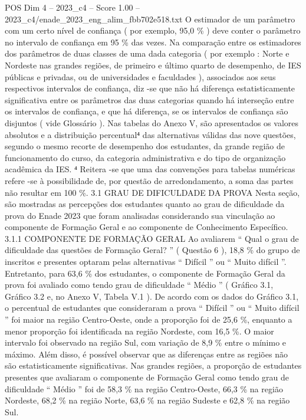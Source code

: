 \begin{textsample}{POS Dim 4 – 2023\_c4 – Score 1.00 – 2023\_c4/enade\_2023\_eng\_alim\_fbb702e518.txt}
O estimador de um parâmetro com um certo nível de confiança ( por exemplo, 95,0 \% ) deve conter o parâmetro no intervalo de confiança em 95 \% das vezes.
Na comparação entre os estimadores dos parâmetros de duas classes de uma dada categoria ( por exemplo : Norte e Nordeste nas grandes regiões, de primeiro e último quarto de desempenho, de IES públicas e privadas, ou de universidades e faculdades ), associados aos seus respectivos intervalos de confiança, diz -se que não há diferença estatisticamente significativa entre os parâmetros das duas categorias quando há interseção entre os intervalos de confiança, e que há diferença, se os intervalos de confiança são disjuntos ( vide Glossário ).
Nas tabelas do Anexo V, são apresentados os valores absolutos e a distribuição percentual⁴ das alternativas válidas das nove questões, segundo o mesmo recorte de desempenho dos estudantes, da grande região de funcionamento do curso, da categoria administrativa e do tipo de organização acadêmica da IES. ⁴ Reitera -se que uma das convenções para tabelas numéricas refere -se à possibilidade de, por questão de arredondamento, a soma das partes não resultar em 100 \%. 3.1 GRAU DE DIFICULDADE DA PROVA Nesta seção, são mostradas as percepções dos estudantes quanto ao grau de dificuldade da prova do Enade 2023 que foram analisadas considerando sua vinculação ao componente de Formação Geral e ao componente de Conhecimento Específico. 3.1.1 COMPONENTE DE FORMAÇÃO GERAL Ao avaliarem “ Qual o grau de dificuldade das questões de Formação Geral? ” ( Questão 6 ), 18,8 \% do grupo de inscritos e presentes optaram pelas alternativas “ Difícil ” ou “ Muito difícil ”.
Entretanto, para 63,6 \% dos estudantes, o componente de Formação Geral da prova foi avaliado como tendo grau de dificuldade “ Médio ” ( Gráfico 3.1, Gráfico 3.2 e, no Anexo V, Tabela V.1 ).
De acordo com os dados do Gráfico 3.1, o percentual de estudantes que consideraram a prova “ Difícil ” ou “ Muito difícil ” foi maior na região Centro-Oeste, onde a proporção foi de 25,6 \%, enquanto a menor proporção foi identificada na região Nordeste, com 16,5 \%.
O maior intervalo foi observado na região Sul, com variação de 8,9 \% entre o mínimo e máximo.
Além disso, é possível observar que as diferenças entre as regiões não são estatisticamente significativas.
Nas grandes regiões, a proporção de estudantes presentes que avaliaram o componente de Formação Geral como tendo grau de dificuldade “ Médio ” foi de 58,3 \% na região Centro-Oeste, 66,3 \% na região Nordeste, 68,2 \% na região Norte, 63,6 \% na região Sudeste e 62,8 \% na região Sul.

\end{textsample}
